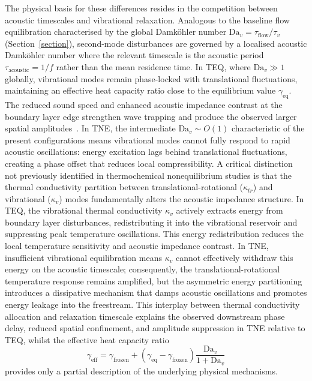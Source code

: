 The physical basis for these differences resides in the competition between acoustic timescales and vibrational relaxation. Analogous to the baseline flow equilibration characterised by the global Damköhler number $\text{Da}_v = \tau_{\text{flow}}/\tau_v$ (Section~\ref{section}), second-mode disturbances are governed by a localised acoustic Damköhler number where the relevant timescale is the acoustic period $\tau_{\text{acoustic}} = 1/f$ rather than the mean residence time. In \gls{TEQ}, where $\text{Da}_v \gg 1$ globally, vibrational modes remain phase-locked with translational fluctuations, maintaining an effective heat capacity ratio close to the equilibrium value $\gamma_{\text{eq}}$. The reduced sound speed and enhanced acoustic impedance contrast at the boundary layer edge strengthen wave trapping and produce the observed larger spatial amplitudes~\citep{ZhangZhang2022,Varma2025}. In \gls{TNE}, the intermediate $\text{Da}_v \sim O(1)$ characteristic of the present configurations means vibrational modes cannot fully respond to rapid acoustic oscillations: energy excitation lags behind translational fluctuations, creating a phase offset that reduces local compressibility. A critical distinction not previously identified in thermochemical nonequilibrium studies is that the thermal conductivity partition between translational-rotational ($\kappa_{tr}$) and vibrational ($\kappa_v$) modes fundamentally alters the acoustic impedance structure. In \gls{TEQ}, the vibrational thermal conductivity $\kappa_v$ actively extracts energy from boundary layer disturbances, redistributing it into the vibrational reservoir and suppressing peak temperature oscillations. This energy redistribution reduces the local temperature sensitivity and acoustic impedance contrast. In \gls{TNE}, insufficient vibrational equilibration means $\kappa_v$ cannot effectively withdraw this energy on the acoustic timescale; consequently, the translational-rotational temperature response remains amplified, but the asymmetric energy partitioning introduces a dissipative mechanism that damps acoustic oscillations and promotes energy leakage into the freestream. This interplay between thermal conductivity allocation and relaxation timescale explains the observed downstream phase delay, reduced spatial confinement, and amplitude suppression in \gls{TNE} relative to \gls{TEQ}, whilst the effective heat capacity ratio
\begin{equation}
\gamma_{\text{eff}} = \gamma_{\text{frozen}} + (\gamma_{\text{eq}} - \gamma_{\text{frozen}}) \frac{\text{Da}_v}{1 + \text{Da}_v}
\end{equation}
provides only a partial description of the underlying physical mechanisms.





